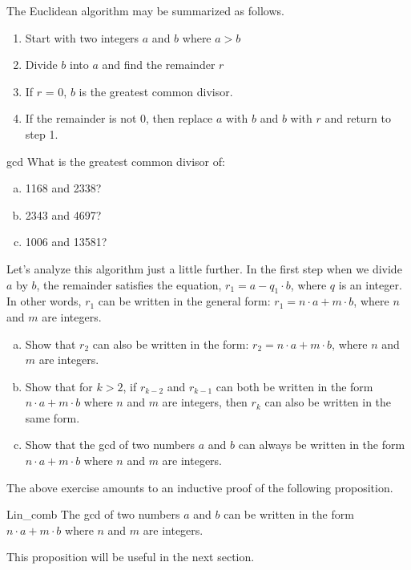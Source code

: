The Euclidean algorithm may be summarized as follows.

\begin{enumerate}[1:]
\item
Start with two integers $a$ and $b$ where $a > b$
\item
Divide $b$ into $a$ and find the remainder $r$
\item
If $r$ = 0, $b$ is the greatest common divisor.
\item
If the remainder is not 0, then replace $a$ with $b$ and $b$ with $r$ and return  to step 1.
\end{enumerate}


\begin{exercise}{gcd}
What is the greatest common divisor of:
\begin{enumerate}[(a)]
\item
1168 and 2338?
\item
2343 and 4697?
\item
1006 and 13581?
\end{enumerate}
\end{exercise} 

Let's analyze this algorithm just a little further.  In the first step when we divide $a$ by $b$, the remainder satisfies the equation,  $r_1 = a - q_1\cdot b$, where $q$ is an integer.  In other words, $r_1$ can be written in the general form:  $r_1 = n \cdot a + m \cdot b$, where $n$ and $m$ are integers.

\begin{exercise}{71}
\begin{enumerate}[(a)]
\item  
Show that $r_2$ can also be written in the form: $r_2 = n \cdot a + m \cdot b$, where $n$ and $m$ are integers.
\item
Show that for $k>2$, if $r_{k-2}$ and $r_{k-1}$ can both be written in the form  $n \cdot a + m \cdot b$ where $n$ and $m$ are integers, then $r_k$ can also be written in the same form.
\item
Show that the gcd of two numbers $a$ and $b$ can always be written in the form $n \cdot a + m \cdot b$ where $n$ and $m$ are integers.
\end{enumerate}
\end{exercise}

The above exercise amounts to an inductive proof of the following proposition.

\begin{prop}{Lin_comb}
The gcd of two numbers $a$ and $b$ can be written in the form $n \cdot a + m \cdot b$ where $n$ and $m$ are integers.
\end{prop}
\noindent
This proposition will be useful in the next section.

